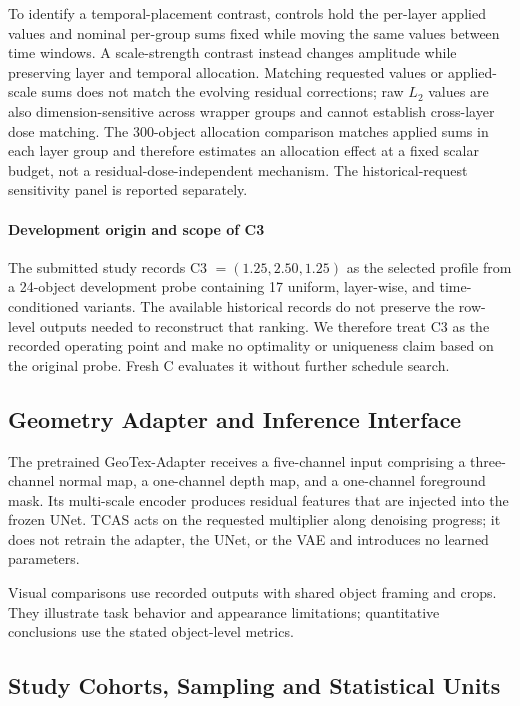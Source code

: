 \documentclass[times,twocolumn,final]{elsarticle}
\begin{document}
To identify a temporal-placement contrast, controls hold the per-layer applied values and nominal per-group sums fixed while moving the same values between time windows. A scale-strength contrast instead changes amplitude while preserving layer and temporal allocation. Matching requested values or applied-scale sums does not match the evolving residual corrections; raw $L_2$ values are also dimension-sensitive across wrapper groups and cannot establish cross-layer dose matching. The 300-object allocation comparison matches applied sums in each layer group and therefore estimates an allocation effect at a fixed scalar budget, not a residual-dose-independent mechanism. The historical-request sensitivity panel is reported separately.

\paragraph{Development origin and scope of C3}
The submitted study records C3 $=(1.25,2.50,1.25)$ as the selected profile from a 24-object development probe containing 17 uniform, layer-wise, and time-conditioned variants. The available historical records do not preserve the row-level outputs needed to reconstruct that ranking. We therefore treat C3 as the recorded operating point and make no optimality or uniqueness claim based on the original probe. Fresh C evaluates it without further schedule search.

\subsection{Geometry Adapter and Inference Interface}
\label{subsec:adapterimpl}

The pretrained GeoTex-Adapter receives a five-channel input comprising a three-channel normal map, a one-channel depth map, and a one-channel foreground mask. Its multi-scale encoder produces residual features that are injected into the frozen UNet. TCAS acts on the requested multiplier along denoising progress; it does not retrain the adapter, the UNet, or the VAE and introduces no learned parameters.

Visual comparisons use recorded outputs with shared object framing and crops. They illustrate task behavior and appearance limitations; quantitative conclusions use the stated object-level metrics.

\subsection{Study Cohorts, Sampling and Statistical Units}
\label{subsec:setup}
\end{document}
